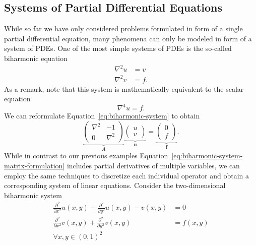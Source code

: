 \subsection{Systems of Partial Differential Equations}
While so far we have only considered problems formulated in form of a single partial differential equation, many phenomena can only be modeled in form of a system of PDEs.
One of the most simple systems of PDEs is the so-called biharmonic equation
\begin{equation}
	\begin{split}
		\nabla^2 u & = v  \\
		\nabla^2 v & = f.
	\end{split}
\label{eq:biharmonic-system}
\end{equation}
As a remark, note that this system is mathematically equivalent to the scalar equation 
\begin{equation}
	\nabla^4 u = f.
\end{equation}
We can reformulate Equation~\eqref{eq:biharmonic-system} to obtain
\begin{equation}
	\underbrace{
	\begin{pmatrix}
		\nabla^2 & -1 \\
		0 & \nabla^2
	\end{pmatrix}}_{A}
\underbrace{ 
	\begin{pmatrix}
		u \\ v
	\end{pmatrix}
}_{\bm{u}}
=
\underbrace{
\begin{pmatrix}
	0 \\ f
\end{pmatrix}
}_{\bm{f}}.
\label{eq:biharmonic-system-matrix-formulation}
\end{equation}
While in contrast to our previous examples Equation~\eqref{eq:biharmonic-system-matrix-formulation} includes partial derivatives of multiple variables, we can employ the same techniques to discretize each individual operator and obtain a corresponding system of linear equations. 
Consider the two-dimensional biharmonic system
\begin{equation}
	\begin{split}
		\frac{\partial^2}{\partial x^2} u(x,y) + \frac{\partial^2}{\partial y^2} u(x,y) - v(x, y) & = 0 \\
		\frac{\partial^2}{\partial x^2} v(x,y) + \frac{\partial^2}{\partial y^2} v(x,y) & = f(x, y) \\ \forall x, y \in (0, 1)^2
	\end{split}
	\label{eq:2D-biharmonic-system}
\end{equation}
